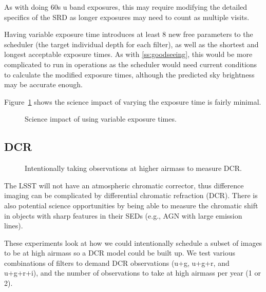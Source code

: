 As with doing 60s u band exposures, this may require modifying the detailed specifics of the SRD as longer exposures may need to count as multiple visits.

Having variable exposure time introduces at least 8 new free parameters to the scheduler (the target individual depth for each filter), as well as the shortest and longest acceptable exposure times.  As with \ref{ss:goodseeing}, this would be more complicated to run in operations as the scheduler would need current conditions to calculate the modified exposure times, although the predicted sky brightness may be accurate enough.

Figure~\ref{fig:var_radar} shows the science impact of varying the exposure time is fairly minimal. 

\begin{figure}
\caption{Science impact of using variable exposure times.}\label{fig:var_radar}
\end{figure}


\subsection{DCR}

\begin{figure}
\caption{Intentionally taking observations at higher airmass to measure DCR.}
\end{figure}


The LSST will not have an atmospheric chromatic corrector, thus difference imaging can be complicated by differential chromatic refraction (DCR). There is also potential science opportunities by being able to measure the chromatic shift in objects with sharp features in their SEDs (e.g., AGN with large emission lines).

These experiments look at how we could intentionally schedule a subset of images to be at high airmass so a DCR model could be built up. We test various combinations of filters to demand DCR observations (u+g, u+g+r, and u+g+r+i), and the number of observations to take at high airmass per year (1 or 2). 

